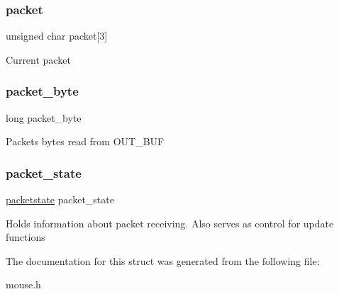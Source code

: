 \subsubsection{\texorpdfstring{packet}{packet}}
{\footnotesize\ttfamily unsigned char packet\mbox{[}3\mbox{]}}

Current packet \hypertarget{struct_mouse_a005ddb9e0f69d5f8ff8ba9811006637f}{}\label{struct_mouse_a005ddb9e0f69d5f8ff8ba9811006637f} 
\subsubsection{\texorpdfstring{packet\+\_\+byte}{packet\_byte}}
{\footnotesize\ttfamily long packet\+\_\+byte}

Packets\textquotesingle{} bytes read from O\+U\+T\+\_\+\+B\+UF \hypertarget{struct_mouse_a600d48813331aacf281603f33b7ce452}{}\label{struct_mouse_a600d48813331aacf281603f33b7ce452} 
\subsubsection{\texorpdfstring{packet\+\_\+state}{packet\_state}}
{\footnotesize\ttfamily \hyperlink{group__mouse_ga15fce23ec12347df2f9ef8c3366eb01d}{packetstate} packet\+\_\+state}

Holds information about packet receiving. Also serves as control for update functions 

The documentation for this struct was generated from the following file\+:\begin{DoxyCompactItemize}
\item 
mouse.\+h\end{DoxyCompactItemize}
